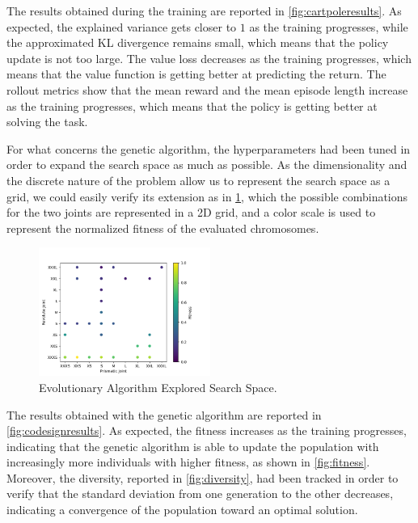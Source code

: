 The results obtained during the training are reported in \cref{fig:cartpoleresults}. As expected, the explained variance gets closer to $1$ as the training progresses, while the approximated KL divergence remains small, which means that the policy update is not too large. The value loss decreases as the training progresses, which means that the value function is getting better at predicting the return. The rollout metrics show that the mean reward and the mean episode length increase as the training progresses, which means that the policy is getting better at solving the task.

For what concerns the genetic algorithm, the hyperparameters had been tuned in order to expand the search space as much as possible. As the dimensionality and the discrete nature of the problem allow us to represent the search space as a grid, we could easily verify its extension as in \cref{fig:searchspace}, which the possible combinations for the two joints are represented in a 2D grid, and a color scale is used to represent the normalized fitness of the evaluated chromosomes.

\begin{figure}
    \centering
    \caption{Evolutionary Algorithm Explored Search Space.}
    \label{fig:searchspace}
    \includegraphics[width=0.5\textwidth]{Images/search_space.png}
\end{figure}

The results obtained with the genetic algorithm are reported in \cref{fig:codesignresults}. As expected, the fitness increases as the training progresses, indicating that the genetic algorithm is able to update the population with increasingly more individuals with higher fitness, as shown in \cref{fig:fitness}. Moreover, the diversity, reported in \cref{fig:diversity}, had been tracked in order to verify that the standard deviation from one generation to the other decreases, indicating a convergence of the population toward an optimal solution.

